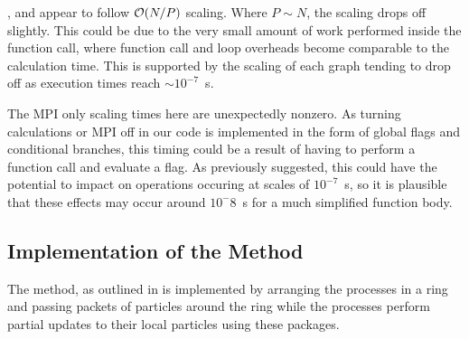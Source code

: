 \begin{figure}[!h]
    
    \caption{}
    \label{fig:v0_systolic_individual_operation_4096_logtime}
\end  {figure}

\begin{figure}[!h]
    
    \caption{}
    \label{fig:v0_systolic_individual_operation_32768_logtime}
\end  {figure}

\vZeroTimeExplanation
    {}
    {}
    {}
    {\individualoperation{}}
    {\systolicloop{}}

,
 and
appear to follow $\mathcal{O}{\left({ N/P }\right)}$ scaling.
%
Where $P \sim{} N$, the scaling drops off slightly.
%
This could be due to the very small amount of work performed
inside the function call, where function call and loop overheads
become comparable to the calculation time.
%
This is supported by the scaling of each graph tending to drop off
as execution times reach $\sim{} 10^{-7}$~s.

The MPI only scaling times here are unexpectedly nonzero.
%
As turning calculations or MPI off in our code is implemented in
the form of global flags and conditional branches, this timing
could be a result of having to perform a function call and
evaluate a flag.
%
As previously suggested, this could have the potential to impact on
operations occuring at scales of $10^{-7}$~s, so it is plausible
that these effects may occur around $10^-{8}$~s for a much simplified
function body.


%
%

\subsection{Implementation of the \pairoperation{} Method}

The \pairoperation{} method, as outlined in 
is implemented by arranging the processes in a ring and passing
packets of particles around the ring while the processes perform
partial updates to their local particles using these packages.

